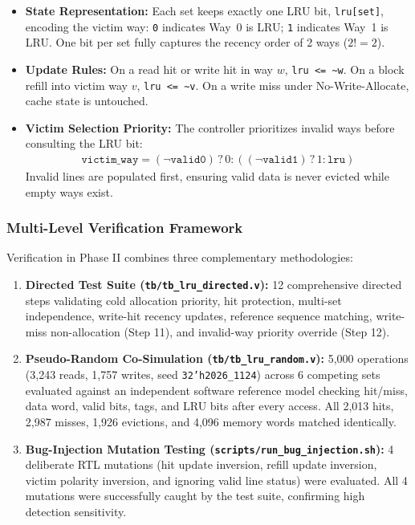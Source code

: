 \documentclass[journal,10pt,twocolumn]{IEEEtran}
\begin{document}
\begin{itemize}
    \item \textbf{State Representation:} Each set keeps exactly one LRU bit, \texttt{lru[set]}, encoding the victim way: \texttt{0} indicates Way~0 is LRU; \texttt{1} indicates Way~1 is LRU. One bit per set fully captures the recency order of 2 ways ($2! = 2$).
    \item \textbf{Update Rules:} On a read hit or write hit in way $w$, \texttt{lru <= \textasciitilde w}. On a block refill into victim way $v$, \texttt{lru <= \textasciitilde v}. On a write miss under No-Write-Allocate, cache state is untouched.
    \item \textbf{Victim Selection Priority:} The controller prioritizes invalid ways before consulting the LRU bit:
    \begin{align*}
        \texttt{victim\_way} = (\neg\texttt{valid0}) \,?\, 0 : ((\neg\texttt{valid1}) \,?\, 1 : \texttt{lru})
    \end{align*}
    Invalid lines are populated first, ensuring valid data is never evicted while empty ways exist.
\end{itemize}

\subsubsection{Multi-Level Verification Framework}
Verification in Phase II combines three complementary methodologies:
\begin{enumerate}
    \item \textbf{Directed Test Suite (\texttt{tb/tb\_lru\_directed.v}):} 12 comprehensive directed steps validating cold allocation priority, hit protection, multi-set independence, write-hit recency updates, reference sequence matching, write-miss non-allocation (Step 11), and invalid-way priority override (Step 12).
    \item \textbf{Pseudo-Random Co-Simulation (\texttt{tb/tb\_lru\_random.v}):} 5,000 operations (3,243 reads, 1,757 writes, seed \texttt{32'h2026\_1124}) across 6 competing sets evaluated against an independent software reference model checking hit/miss, data word, valid bits, tags, and LRU bits after every access. All 2,013 hits, 2,987 misses, 1,926 evictions, and 4,096 memory words matched identically.
    \item \textbf{Bug-Injection Mutation Testing (\texttt{scripts/run\_bug\_injection.sh}):} 4 deliberate RTL mutations (hit update inversion, refill update inversion, victim polarity inversion, and ignoring valid line status) were evaluated. All 4 mutations were successfully caught by the test suite, confirming high detection sensitivity.
\end{enumerate}
\end{document}

